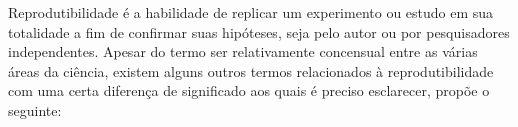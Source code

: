 \documentclass[qual, classic, a4paper]{ufbathesis}
\begin{document}
%
%

Reprodutibilidade é a habilidade de replicar um experimento
ou estudo em sua totalidade a fim de confirmar suas hipóteses, seja pelo autor
ou por pesquisadores independentes. Apesar do termo ser relativamente
concensual entre as várias áreas da ciência, existem alguns outros termos
relacionados à reprodutibilidade com uma certa diferença de significado aos
quais é preciso esclarecer,  propõe o seguinte:


\end{document}
